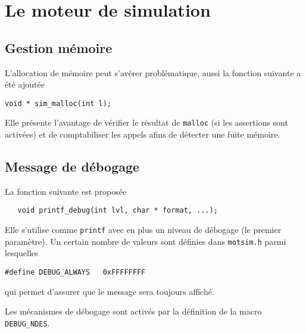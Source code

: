 \documentclass{article}
\begin{document}
%
\section{Le moteur de simulation}
\label{section:motsim}

%
\subsection{Gestion mémoire}

   L'allocation de mémoire peut s'avérer problématique, aussi la
fonction suivante a été ajoutée

\begin{verbatim}
void * sim_malloc(int l);
\end{verbatim}

   Elle présente l'avantage de vérifier le résultat de {\tt malloc}
(si les assertions sont activées) et de comptabiliser les appels afins
de détecter une fuite mémoire.

%
\subsection{Message de débogage}

   La fonction suivante est proposée 

\begin{verbatim}
   void printf_debug(int lvl, char * format, ...);
\end{verbatim}

   Elle s'utilise comme {\tt printf} avec en plus un niveau de
débogage (le premier paramètre). Un certain nombre de valeurs sont
définies dans {\tt motsim.h} parmi lesquelles

\begin{verbatim}
#define DEBUG_ALWAYS   0xFFFFFFFF
\end{verbatim}

   qui permet d'assurer que le message sera toujours affiché.

   Les mécanismes de débogage sont activés par la définition de la
macro {\tt DEBUG\_NDES}.
\end{document}
